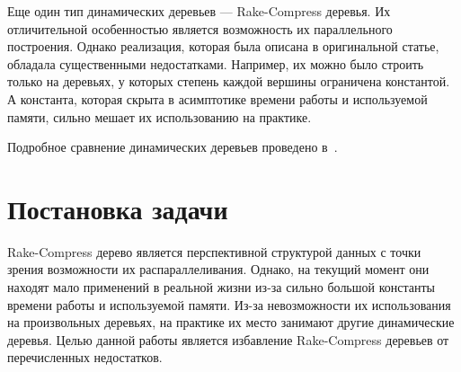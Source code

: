 Еще один тип динамических деревьев --- Rake-Compress деревья. Их отличительной особенностью является возможность их параллельного построения. 
Однако реализация, которая была описана в оригинальной статье, обладала существенными недостатками. 
Например, их можно было строить только на деревьях, у которых степень каждой вершины ограничена константой. 
А константа, которая скрыта в асимптотике времени работы и используемой памяти, сильно мешает их использованию на практике.

Подробное сравнение динамических деревьев проведено в~\cite{tarj07}.

\FloatBarrier

\section{Постановка задачи}

Rake-Compress дерево является перспективной структурой данных с точки зрения возможности их распараллеливания. 
Однако, на текущий момент они находят мало применений в реальной жизни из-за сильно большой константы времени работы и используемой памяти.
Из-за невозможности их использования на произвольных деревьях, на практике их место занимают другие динамические деревья.
Целью данной работы является избавление Rake-Compress деревьев от перечисленных недостатков. 



\FloatBarrier

